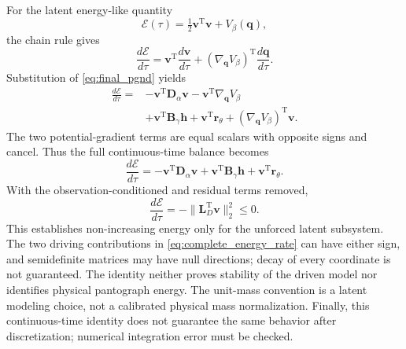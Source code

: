 \documentclass[journal,twoside]{IEEEtran}
\begin{document}
For the latent energy-like quantity
\begin{equation}
    \mathcal E(\tau)=\tfrac12\mathbf v^{\mathrm T}\mathbf v
    +V_\beta(\mathbf q),
    \label{eq:latent_energy}
\end{equation}
the chain rule gives
\begin{equation}
    \frac{d\mathcal E}{d\tau}
    =\mathbf v^{\mathrm T}\frac{d\mathbf v}{d\tau}
    +(\nabla_{\mathbf q}V_\beta)^{\mathrm T}
      \frac{d\mathbf q}{d\tau}.
    \label{eq:energy_chain_rule}
\end{equation}
Substitution of \eqref{eq:final_pgnd} yields
\begin{equation}
\begin{aligned}
    \frac{d\mathcal E}{d\tau}
    ={}&-\mathbf v^{\mathrm T}\mathbf D_\alpha\mathbf v
         -\mathbf v^{\mathrm T}\nabla_{\mathbf q}V_\beta\\
       &+\mathbf v^{\mathrm T}\mathbf B_\gamma\mathbf h
         +\mathbf v^{\mathrm T}\mathbf r_\theta
         +(\nabla_{\mathbf q}V_\beta)^{\mathrm T}\mathbf v.
\end{aligned}
    \label{eq:energy_substitution}
\end{equation}
The two potential-gradient terms are equal scalars with opposite signs
and cancel. Thus the full continuous-time balance becomes
\begin{equation}
    \frac{d\mathcal E}{d\tau}
    =-\mathbf v^{\mathrm T}\mathbf D_\alpha\mathbf v
    +\mathbf v^{\mathrm T}\mathbf B_\gamma\mathbf h
    +\mathbf v^{\mathrm T}\mathbf r_\theta.
    \label{eq:complete_energy_rate}
\end{equation}
With the observation-conditioned and residual terms removed,
\begin{equation}
    \frac{d\mathcal E}{d\tau}
    =-\|\mathbf L_D^{\mathrm T}\mathbf v\|_2^2\leq0.
    \label{eq:energy_dissipation}
\end{equation}
This establishes non-increasing energy only for the unforced latent
subsystem. The two driving contributions in
\eqref{eq:complete_energy_rate} can have either sign, and semidefinite
matrices may have null directions; decay of every coordinate is not
guaranteed. The identity neither proves stability of the driven model nor
identifies physical pantograph energy. The unit-mass convention is a
latent modeling choice, not a calibrated physical mass normalization.
Finally, this continuous-time identity does not guarantee the same
behavior after discretization; numerical integration error must be checked.
\end{document}
